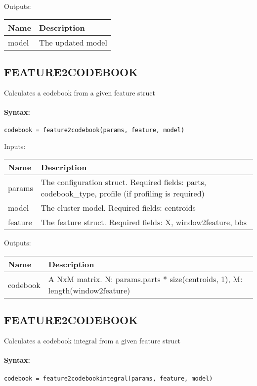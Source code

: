 \bigskip
Outputs:

\begin{tabular}{|p{}|p{}|}
\hline
\textbf{Name} & \textbf{Description} \\
\hline \hline
model & The updated model  \\ \hline
\end{tabular}

\subsection{FEATURE2CODEBOOK}

Calculates a codebook from a given feature struct

\paragraph{Syntax:} \verb|codebook = feature2codebook(params, feature, model)|

\bigskip
Inputs:

\begin{tabular}{|p{}|p{}|}
\hline
\textbf{Name} & \textbf{Description} \\
\hline \hline
params & The configuration struct. Required fields: parts, codebook\_type, profile (if profiling is required)  \\ \hline
model & The cluster model. Required fields: centroids  \\ \hline
feature & The feature struct. Required fields: X, window2feature, bbs  \\ \hline
\end{tabular}

\bigskip
Outputs:

\begin{tabular}{|p{}|p{}|}
\hline
\textbf{Name} & \textbf{Description} \\
\hline \hline
codebook & A NxM matrix. N: params.parts * size(centroids, 1), M: length(window2feature)  \\ \hline
\end{tabular}

\subsection{FEATURE2CODEBOOK}

Calculates a codebook integral from a given feature struct

\paragraph{Syntax:} \verb|codebook = feature2codebookintegral(params, feature, model)|


